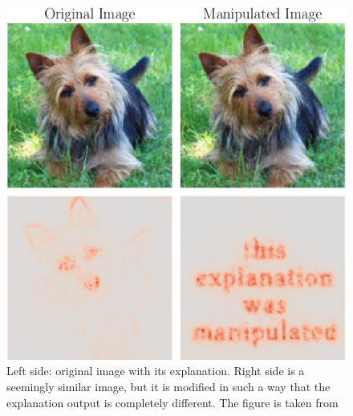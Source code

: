 \documentclass[10pt,twocolumn,letterpaper]{article}
\begin{document}
\begin{figure}
  \includegraphics[scale=.4]{./manipulated_explanation_ai.png}
  \caption{Left side: original image with its explanation. Right side is a seemingly similar image, but it is modified in such a way that the explanation output is completely different. The figure is taken from~\cite{geometryToBlame}}
\label{fig:arbitrary}
\end{figure}

\end{document}
